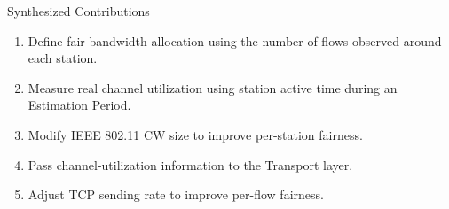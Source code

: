 

\begin{frame}{Synthesized Contributions}
\begin{enumerate}
\item Define fair bandwidth allocation using the number of flows observed around each station.
\item Measure real channel utilization using station active time during an Estimation Period.
\item Modify IEEE 802.11 CW size to improve per-station fairness.
\item Pass channel-utilization information to the Transport layer.
\item Adjust TCP sending rate to improve per-flow fairness.
\end{enumerate}
\vspace{0.35cm}
\end{frame}
